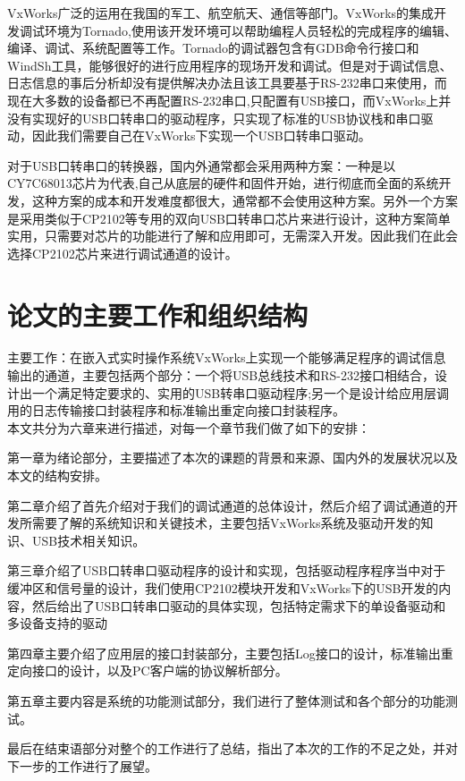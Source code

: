 	VxWorks广泛的运用在我国的军工、航空航天、通信等部门\cite{陈洋2007VxWorks}\cite{张鹏2007基于}。VxWorks的集成开发调试环境为Tornado,使用该开发环境可以帮助编程人员轻松的完成程序的编辑、编译、调试、系统配置等工作\cite{嵌入式实时操作系统VxWorks及其开发环境Tornado}\cite{Tronado}。Tornado的调试器包含有GDB命令行接口和WindSh工具，能够很好的进行应用程序的现场开发和调试。但是对于调试信息、日志信息的事后分析却没有提供解决办法且该工具要基于RS-232串口来使用，而现在大多数的设备都已不再配置RS-232串口,只配置有USB接口，而VxWorks上并没有实现好的USB口转串口的驱动程序，只实现了标准的USB协议栈和串口驱动，因此我们需要自己在VxWorks下实现一个USB口转串口驱动。
	
	对于USB口转串口的转换器，国内外通常都会采用两种方案：一种是以CY7C68013芯片为代表,自己从底层的硬件和固件开始，进行彻底而全面的系统开发，这种方案的成本和开发难度都很大，通常都不会使用这种方案。另外一个方案是采用类似于CP2102等专用的双向USB口转串口芯片来进行设计，这种方案简单实用，只需要对芯片的功能进行了解和应用即可，无需深入开发\cite{Yao2009Design}\cite{Zhou2002The}。因此我们在此会选择CP2102芯片来进行调试通道的设计。	
	
	

\section{论文的主要工作和组织结构}	
	主要工作：在嵌入式实时操作系统VxWorks上实现一个能够满足程序的调试信息输出的通道，主要包括两个部分：一个将USB总线技术和RS-232接口相结合，设计出一个满足特定要求的、实用的USB转串口驱动程序;另一个是设计给应用层调用的日志传输接口封装程序和标准输出重定向接口封装程序。\\
 本文共分为六章来进行描述，对每一个章节我们做了如下的安排：
 
 第一章为绪论部分，主要描述了本次的课题的背景和来源、国内外的发展状况以及本文的结构安排。
 
 第二章介绍了首先介绍对于我们的调试通道的总体设计，然后介绍了调试通道的开发所需要了解的系统知识和关键技术，主要包括VxWorks系统及驱动开发的知识、USB技术相关知识。
 
 第三章介绍了USB口转串口驱动程序的设计和实现，包括驱动程序程序当中对于缓冲区和信号量的设计，我们使用CP2102模块开发和VxWorks下的USB开发的内容，然后给出了USB口转串口驱动的具体实现，包括特定需求下的单设备驱动和多设备支持的驱动
 
 第四章主要介绍了应用层的接口封装部分，主要包括Log接口的设计，标准输出重定向接口的设计，以及PC客户端的协议解析部分。
 
 第五章主要内容是系统的功能测试部分，我们进行了整体测试和各个部分的功能测试。
 
 最后在结束语部分对整个的工作进行了总结，指出了本次的工作的不足之处，并对下一步的工作进行了展望。 

